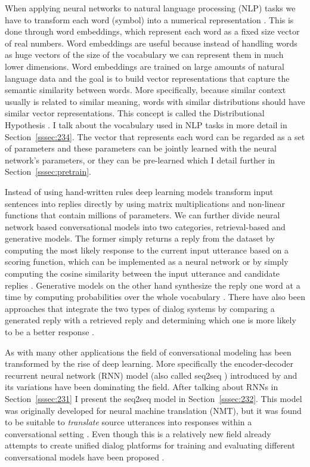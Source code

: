 \documentclass[12pt]{article}
\begin{document}
When applying neural networks to natural language processing (NLP) tasks we have to transform each word (symbol) into a numerical representation \cite{Bengio:2003}. This is done through word embeddings, which represent each word as a fixed size vector of real numbers. Word embeddings are useful because instead of handling words as huge vectors of the size of the vocabulary we can represent them in much lower dimensions. Word embeddings are trained on large amounts of natural language data and the goal is to build vector representations that capture the semantic similarity between words. More specifically, because similar context usually is related to similar meaning, words with similar distributions should have similar vector representations. This concept is called the Distributional Hypothesis \cite{Harris:1954}. I talk about the vocabulary used in NLP tasks in more detail in Section~\ref{sssec:234}. The vector that represents each word can be regarded as a set of parameters and these parameters can be jointly learned with the neural network's parameters, or they can be pre-learned which I detail further in Section~\ref{sssec:pretrain}.

Instead of using hand-written rules deep learning models transform input sentences into replies directly by using matrix multiplications and non-linear functions that contain millions of parameters. We can further divide neural network based conversational models into two categories, retrieval-based and generative models. The former simply returns a reply from the dataset by computing the most likely response to the current input utterance based on a scoring function, which can be implemented as a neural network \cite{Cho:2014} or by simply computing the cosine similarity between the input utterance and candidate replies \cite{stalemate:2016}. Generative models on the other hand synthesize the reply one word at a time by computing probabilities over the whole vocabulary \cite{Sutskever:2014,Vinyals:2015}. There have also been approaches that integrate the two types of dialog systems by comparing a generated reply with a retrieved reply and determining which one is more likely to be a better response \cite{Song:2016}.

As with many other applications the field of conversational modeling has been transformed by the rise of deep learning. More specifically the encoder-decoder recurrent neural network (RNN) model (also called seq2seq \cite{Sutskever:2014}) introduced by \cite{Cho:2014} and its variations have been dominating the field. After talking about RNNs in Section~\ref{sssec:231} I present the seq2seq model in Section~\ref{sssec:232}. This model was originally developed for neural machine translation (NMT), but it was found to be suitable to \textit{translate} source utterances into responses within a conversational setting \cite{Shang:2015,Vinyals:2015}. Even though this is a relatively new field already attempts to create unified dialog platforms for training and evaluating different conversational models have been proposed \cite{Miller:2017}.
\end{document}
